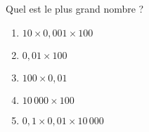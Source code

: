 Quel est le plus grand nombre ?
\begin{enumerate}[A/]
\item $10\times0,001\times100$
\item $0,01\times100$
\item $100\times0,01$
\item $10\,000\times100$
\item $0,1\times0,01\times10\,000$
\end{enumerate}